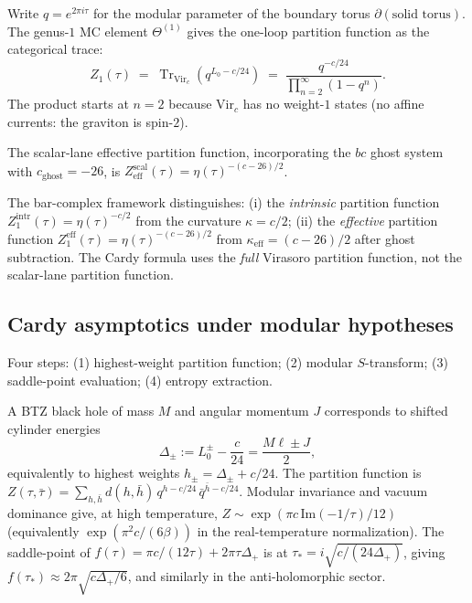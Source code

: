 \documentclass[11pt]{article}
\newcommand{\Tr}{\operatorname{Tr}}
\begin{document}
Write $q = e^{2\pi i\tau}$ for the modular parameter of the
boundary torus $\partial(\text{solid torus})$.  The genus-$1$
MC element $\Theta^{(1)}$ gives the one-loop partition function
as the categorical trace:
\begin{equation}\label{eq:btz-Z1}
Z_1(\tau)
\;=\;
\Tr_{\mathrm{Vir}_c}\!\left(q^{L_0 - c/24}\right)
\;=\;
\frac{q^{-c/24}}{\prod_{n=2}^{\infty}(1-q^n)}.
\end{equation}
The product starts at $n=2$ because $\mathrm{Vir}_c$ has no
weight-$1$ states (no affine currents: the graviton is spin-$2$).

The scalar-lane effective partition function, incorporating the
$bc$ ghost system with $c_{\mathrm{ghost}} = -26$, is
$Z_{\mathrm{eff}}^{\mathrm{scal}}(\tau) = \eta(\tau)^{-(c-26)/2}$.

\begin{observation}
\label{obs:two-partition-functions-wn}
The bar-complex framework distinguishes:
(i) the \emph{intrinsic} partition function
$Z_1^{\mathrm{intr}}(\tau) = \eta(\tau)^{-c/2}$ from the
curvature $\kappa = c/2$;
(ii) the \emph{effective} partition function
$Z_1^{\mathrm{eff}}(\tau) = \eta(\tau)^{-(c-26)/2}$ from
$\kappa_{\mathrm{eff}} = (c-26)/2$ after ghost subtraction.
The Cardy formula uses the \emph{full} Virasoro partition
function, not the scalar-lane partition function.
\end{observation}

\subsection{Cardy asymptotics under modular hypotheses}
\label{subsec:btz-cardy-derivation}

Four steps: (1) highest-weight partition function; (2) modular
$S$-transform; (3) saddle-point evaluation; (4) entropy extraction.

A BTZ black hole of mass $M$ and angular momentum $J$ corresponds
to shifted cylinder energies
\[
\Delta_\pm := L_0^\pm-\frac{c}{24}
= \frac{M\ell \pm J}{2},
\]
equivalently to highest weights
$h_\pm=\Delta_\pm+c/24$.
The partition function is
$Z(\tau,\bar\tau) = \sum_{h,\bar h} d(h,\bar h)\,
q^{h - c/24}\,\bar q^{\bar h - c/24}$.
Modular invariance and vacuum dominance give, at high temperature,
$Z \sim \exp(\pi c\,\mathrm{Im}(-1/\tau)/12)$
(equivalently $\exp(\pi^2 c/(6\beta))$ in the real-temperature
normalization).
The saddle-point of
$f(\tau) = \pi c/(12\tau) + 2\pi\tau\Delta_+$
is at $\tau_* = i\sqrt{c/(24\Delta_+)}$, giving
$f(\tau_*) \approx 2\pi\sqrt{c\Delta_+/6}$, and similarly in
the anti-holomorphic sector.
\end{document}
